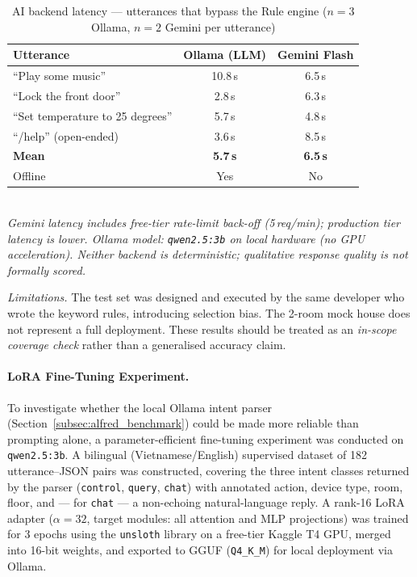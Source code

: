 \begin{table}[H]
\centering
\caption[AI backend latency --- Ollama and Gemini]{AI backend latency --- utterances that bypass the Rule engine ($n=3$ Ollama, $n=2$ Gemini per utterance)}
\label{tab:ai_backend_latency}
\small
\begin{tabular}{@{} l c c @{}}
\toprule
\textbf{Utterance} & \textbf{Ollama (LLM)} & \textbf{Gemini Flash} \\
\midrule
``Play some music''               & 10.8\,s & 6.5\,s \\
``Lock the front door''           &  2.8\,s & 6.3\,s \\
``Set temperature to 25 degrees'' &  5.7\,s & 4.8\,s \\
``/help'' (open-ended)            &  3.6\,s & 8.5\,s \\
\midrule
\textbf{Mean}                     & \textbf{5.7\,s} & \textbf{6.5\,s} \\
Offline                           & Yes & No \\
\bottomrule
\end{tabular}
\footnotesize\\\textit{Gemini latency includes free-tier rate-limit back-off (5\,req/min); production tier latency is lower.
Ollama model: \texttt{qwen2.5:3b} on local hardware (no GPU acceleration).
Neither backend is deterministic; qualitative response quality is not formally scored.}
\end{table}

\textit{Limitations.} The test set was designed and executed by the same developer who wrote the keyword rules, introducing selection bias. The 2-room mock house does not represent a full deployment. These results should be treated as an \textit{in-scope coverage check} rather than a generalised accuracy claim.

\paragraph{LoRA Fine-Tuning Experiment.}

To investigate whether the local Ollama intent parser (Section~\ref{subsec:alfred_benchmark}) could be made more reliable than prompting alone, a parameter-efficient fine-tuning experiment was conducted on \texttt{qwen2.5:3b}. A bilingual (Vietnamese/English) supervised dataset of 182 utterance–JSON pairs was constructed, covering the three intent classes returned by the parser (\texttt{control}, \texttt{query}, \texttt{chat}) with annotated action, device type, room, floor, and --- for \texttt{chat} --- a non-echoing natural-language reply. A rank-16 LoRA adapter ($\alpha=32$, target modules: all attention and MLP projections) was trained for 3 epochs using the \texttt{unsloth} library on a free-tier Kaggle T4 GPU, merged into 16-bit weights, and exported to GGUF (\texttt{Q4\_K\_M}) for local deployment via Ollama.

